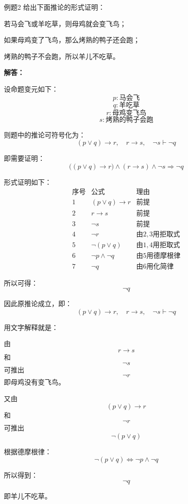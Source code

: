 \begin{question}{例题2}
给出下面推论的形式证明：

若马会飞或羊吃草，则母鸡就会变飞鸟；

如果母鸡变了飞鸟，那么烤熟的鸭子还会跑；

烤熟的鸭子不会跑，所以羊儿不吃草。

\textbf{解答：}

设命题变元如下：
\[
p:\text{马会飞}
\]
\[
q:\text{羊吃草}
\]
\[
r:\text{母鸡变飞鸟}
\]
\[
s:\text{烤熟的鸭子会跑}
\]

则题中的推论可符号化为：
\[
(p\vee q)\to r,\quad r\to s,\quad \neg s \vdash \neg q
\]

即需要证明：
\[
\bigl((p\vee q)\to r\bigr)\land(r\to s)\land \neg s \Rightarrow \neg q
\]

形式证明如下：
\[
\begin{array}{c|l|l}
	序号 & 公式 & 理由 \\
	\hline
	1 & (p\vee q)\to r & 前提 \\
	2 & r\to s & 前提 \\
	3 & \neg s & 前提 \\
	4 & \neg r & 由 2,3 用拒取式 \\
	5 & \neg(p\vee q) & 由 1,4 用拒取式 \\
	6 & \neg p\land \neg q & 由 5 用德摩根律 \\
	7 & \neg q & 由 6 用化简律
\end{array}
\]

所以可得：
\[
\neg q
\]

因此原推论成立，即：
\[
(p\vee q)\to r,\quad r\to s,\quad \neg s \vdash \neg q
\]

用文字解释就是：

由
\[
r\to s
\]
和
\[
\neg s
\]
可推出
\[
\neg r
\]
即母鸡没有变飞鸟。

又由
\[
(p\vee q)\to r
\]
和
\[
\neg r
\]
可推出
\[
\neg(p\vee q)
\]

根据德摩根律：
\[
\neg(p\vee q)\Leftrightarrow \neg p\land \neg q
\]

所以得到：
\[
\neg q
\]

即羊儿不吃草。


\end{question}

